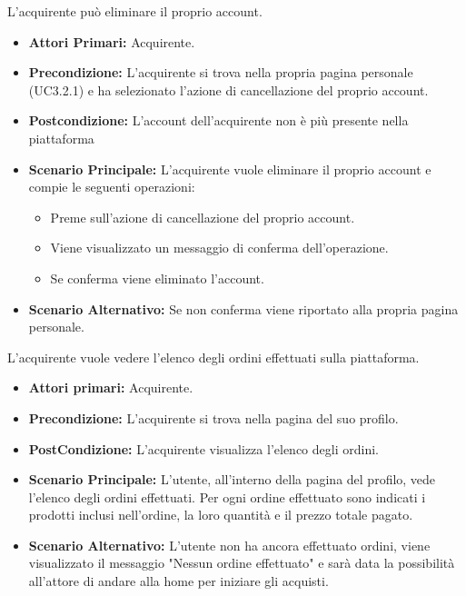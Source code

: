 

L'acquirente può eliminare il proprio account.
\begin{itemize}
    \item \textbf{Attori Primari:} Acquirente.
    \item \textbf{Precondizione:} L'acquirente si trova nella propria pagina personale (UC3.2.1) e ha selezionato l'azione di cancellazione del proprio account. 
    \item \textbf{Postcondizione:} L'account dell'acquirente non è più presente nella piattaforma
    \item \textbf{Scenario Principale:} L'acquirente vuole eliminare il proprio account e compie le seguenti operazioni:
    \begin{itemize}
        \item Preme sull'azione di cancellazione del proprio account.
        \item Viene visualizzato un messaggio di conferma dell'operazione.
        \item Se conferma viene eliminato l'account.
    \end{itemize}
    \item \textbf{Scenario Alternativo:} Se non conferma viene riportato alla propria pagina personale.
\end{itemize}

L'acquirente vuole vedere l'elenco degli ordini effettuati sulla piattaforma.
\begin{itemize}
    \item \textbf{Attori primari:} Acquirente.
    \item \textbf{Precondizione:} L'acquirente si trova nella pagina del suo profilo.
    \item \textbf{PostCondizione:} L'acquirente visualizza l'elenco degli ordini.
    \item \textbf{Scenario Principale:} L'utente, all'interno della pagina del profilo, vede l'elenco degli ordini effettuati.
        Per ogni ordine effettuato sono indicati i prodotti inclusi nell'ordine, la loro quantità e il prezzo totale pagato.
    \item \textbf{Scenario Alternativo:} L'utente non ha ancora effettuato ordini, viene visualizzato il messaggio "Nessun ordine effettuato" e sarà data la possibilità all'attore di andare alla home per iniziare gli acquisti.
\end{itemize}
